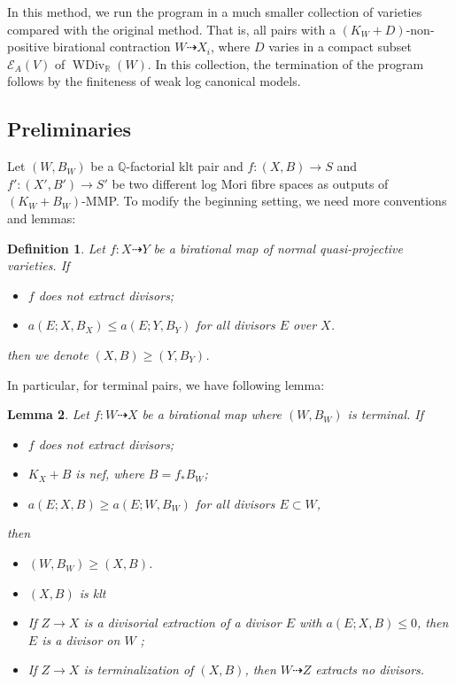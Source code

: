 \documentclass[11pt]{amsart}
\newtheorem{defn}{Definition}[section]
\newtheorem{lem}[defn]{Lemma}
\begin{document}
In this method, we run the program in a much smaller collection of varieties compared with the original method. That is, all pairs with a $(K_{W}+D)$-non-positive birational contraction $W\dashrightarrow X_{i}$, where $D$ varies in a compact subset $\mathcal{E}_{A}(V)$ of $\operatorname{WDiv}_{\mathbb{R}}(W)$. In this collection, the termination of the program follows by the finiteness of weak log canonical models. 
\subsection{Preliminaries}
Let $(W,B_W)$ be a $\mathbb{Q}$-factorial klt pair and $f:(X,B)\to S$ and $f':(X',B')\to S'$ be two different log Mori fibre spaces as outputs of $(K_{W}+B_{W})$-MMP.  To modify the beginning setting, we need more conventions and lemmas:
\begin{defn}
Let $f:X\dashrightarrow Y$ be a birational map of normal quasi-projective varieties. If
\begin{itemize}
  \item $f$ does not extract divisors;
  \item $a(E;X,B_{X})\leqslant a(E;Y,B_{Y})$ for all divisors  $E$  over $X$.
\end{itemize}
then we denote $(X,B)\geqslant (Y,B_{Y})$.
\end{defn}
In particular, for terminal pairs, we have following lemma: 
\begin{lem}\label{terminalorder}
\cite[Lemma 13.8]{haconMinimalModelProgram2012} Let $f:W\dashrightarrow X$ be a birational map where $(W,B_W)$ is terminal. If
\begin{itemize}
  \item $f$ does not extract divisors;
  \item $K_X+B$ is nef, where $B=f_*B_W$;
  \item $a(E;X,B)\geqslant a(E;W,B_W)$ for all divisors $E \subset W$,
\end{itemize}
then
\begin{itemize}
  \item $(W,B_W)\geqslant (X,B)$.
  \item $(X,B)$ is klt
  \item If $Z\to X$ is a divisorial extraction of a divisor $E$ with $a(E;X,B)\leqslant 0$, then $E$ is a divisor on $W$ ;
  \item If $Z\to X$ is terminalization of $(X,B)$, then $W\dashrightarrow Z$ extracts no divisors.
\end{itemize}
\end{lem}
\end{document}
